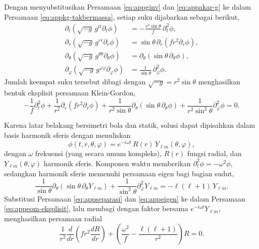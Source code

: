 Dengan menyubstitusikan Persamaan \eqref{eq:appginv} dan \eqref{eq:appakar-g} ke dalam
Persamaan \eqref{eq:appkg-takbermassa}, setiap suku dijabarkan sebagai berikut,
\begin{align}
    \partial_t \left( \sqrt{-g}\, g^{tt} \partial_t \phi \right)
        &= -\frac{r^2 \sin\theta}{f}\, \partial_t^2 \phi, \\
    \partial_r \left( \sqrt{-g}\, g^{rr} \partial_r \phi \right)
        &= \sin\theta\, \partial_r \left( f r^2 \partial_r \phi \right), \\
    \partial_\theta \left( \sqrt{-g}\, g^{\theta\theta} \partial_\theta \phi \right)
        &= \partial_\theta \left( \sin\theta\, \partial_\theta \phi \right), \\
    \partial_\varphi \left( \sqrt{-g}\, g^{\varphi\varphi} \partial_\varphi \phi \right)
        &= \frac{1}{\sin\theta}\, \partial_\varphi^2 \phi.
\end{align}
Jumlah keempat suku tersebut dibagi dengan $\sqrt{-g} = r^2 \sin\theta$ menghasilkan
bentuk eksplisit persamaan Klein-Gordon,
\begin{equation}
    -\frac{1}{f} \partial_t^2 \phi
    + \frac{1}{r^2} \partial_r \left( f r^2 \partial_r \phi \right)
    + \frac{1}{r^2 \sin\theta} \partial_\theta \left( \sin\theta\, \partial_\theta \phi \right)
    + \frac{1}{r^2 \sin^2\theta} \partial_\varphi^2 \phi = 0.
    \label{eq:appeom-eksplisit}
\end{equation}
 
Karena latar belakang bersimetri bola dan statik, solusi dapat dipisahkan dalam basis
harmonik sferis dengan menuliskan
\begin{equation}
    \phi(t, r, \theta, \varphi) = e^{-i\omega t}\, R(r)\, Y_{\ell m}(\theta, \varphi),
    \label{eq:appseparasi}
\end{equation}
dengan $\omega$ frekuensi (yang secara umum kompleks), $R(r)$ fungsi radial, dan
$Y_{\ell m}(\theta, \varphi)$ harmonik sferis. Komponen waktu memberikan
$\partial_t^2 \phi = -\omega^2 \phi$, sedangkan harmonik sferis memenuhi persamaan
eigen bagi bagian sudut,
\begin{equation}
    \frac{1}{\sin\theta} \partial_\theta \left( \sin\theta\, \partial_\theta Y_{\ell m} \right)
    + \frac{1}{\sin^2\theta} \partial_\varphi^2 Y_{\ell m} = -\ell(\ell+1)\, Y_{\ell m}.
    \label{eq:appeigen}
\end{equation}
Substitusi Persamaan \eqref{eq:appseparasi} dan \eqref{eq:appeigen} ke dalam Persamaan
\eqref{eq:appeom-eksplisit}, lalu membagi dengan faktor bersama
$e^{-i\omega t} Y_{\ell m}$, menghasilkan persamaan radial
\begin{equation}
    \frac{1}{r^2} \frac{d}{dr} \left( f r^2 \frac{dR}{dr} \right)
    + \left( \frac{\omega^2}{f} - \frac{\ell(\ell+1)}{r^2} \right) R = 0.
    \label{eq:appradial}
\end{equation}
 
